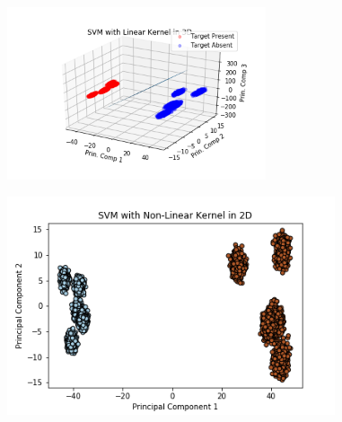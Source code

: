 \documentclass[journal,12pt,twocolumn]{IEEEtran}
\begin{document}
\begin{figure}[!h]
\begin{center}
\includegraphics[width=3in]{figs/LinSVM_3D.png}
\end{center}
\caption{}
\label{fig: 3D Plot}
\end{figure}

\begin{figure}[!h]
\begin{center}
\includegraphics[width=3.8in]{figs/NLinSVM_2D.png}
\end{center}
\caption{}
\label{fig: 3D Plot}
\end{figure}
\end{document}
